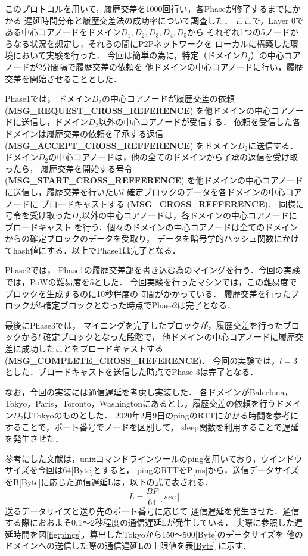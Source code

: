 \documentclass[a4paper,12pt]{jsarticle}
\begin{document}
このプロトコルを用いて，履歴交差を1000回行い，各Phaseが修了するまでにかかる
遅延時間分布と履歴交差法の成功率について調査した．
ここで，Layer 0である中心コアノードをドメイン$D_1, D_2, D_3, D_4, D_5$から
それぞれ1つの5ノードからなる状況を想定し，それらの間にP2Pネットワークを
ローカルに構築した環境において実験を行った．
今回は簡単の為に，特定（ドメイン$D_2$）の中心コアノードが2分間隔で履歴交差の依頼を
他ドメインの中心コアノードに行い，履歴交差を開始させることとした．

Phase1では，
ドメイン$D_2$の中心コアノードが履歴交差の依頼 (\textbf{MSG\_REQUEST\_CROSS\_REFERENCE})
を他ドメインの中心コアノードに送信し，ドメイン$D_2$以外の中心コアノードが受信する．
依頼を受信した各ドメインは履歴交差の依頼を了承する返信 (\textbf{MSG\_ACCEPT\_CROSS\_REFFERENCE})
をドメイン$D_2$に送信する．
ドメイン$D_2$の中心コアノードは，他の全てのドメインから了承の返信を受け取ったら，
履歴交差を開始する号令 (\textbf{MSG\_START\_CROSS\_REFFERENCE}) を他ドメインの中心コアノード
に送信し，履歴交差を行いたい$l$-確定ブロックのデータを各ドメインの中心コアノードに
ブロードキャストする (\textbf{MSG\_CROSS\_REFFERENCE})．
同様に号令を受け取った$D_2$以外の中心コアノードは，各ドメインの中心コアノードにブロードキャスト
を行う．個々のドメインの中心コアノードは全てのドメインからの確定ブロックのデータを受取り，
データを暗号学的ハッシュ関数にかけてhash値にする．以上でPhase1は完了となる．

Phase2では，
Phase1の履歴交差部を書き込む為のマイングを行う．今回の実験では，PoWの難易度を5とした．
今回実験を行ったマシンでは，この難易度でブロックを生成するのに10秒程度の時間がかかっている．
履歴交差を行ったブロックが$l$-確定ブロックとなった時点でPhase2は完了となる．

最後にPhase3では，
マイニングを完了したブロックが，履歴交差を行ったブロックから$l$-確定ブロックとなった段階で，
他ドメインの中心コアノードに履歴交差に成功したことをブロードキャストする
 (\textbf{MSG\_COMPLETE\_CROSS\_REFERENCE})．
今回の実験では，$l=3$とした．ブロードキャストを送信した時点でPhase 3は完了となる．

なお，今回の実装には通信遅延を考慮し実装した．
各ドメインがBalcelona，Tokyo，Paris，Toronto，Washingtonにあるとし，履歴交差の依頼を行うドメイン$D_2$はTokyoのものとした．
2020年2月9日のpingのRTTにかかる時間\cite{pings}を参考にすることで，ポート番号でノードを区別して，
sleep関数を利用することで遅延を発生させた．

参考にした文献\cite{pings}は，unixコマンドラインツールのpingを用いており，ウインドウサイズを今回は$64$[Byte]とすると，
pingのRTTをP[ms]から，送信データサイズをB[Byte]に応じた通信遅延Lは，以下の式で表される．
\begin{equation}
  \label{byt}
    L = \frac{BP}{64} [sec]
\end{equation}
送るデータサイズと送り先のポート番号に応じて
通信遅延を発生させた．通信する際におおよそ0.1〜2秒程度の通信遅延Lが発生している．
実際に参照した遅延時間を図\ref{fig:pings}，算出したTokyoから150〜500[Byte]のデータサイズを
他のドメインへの送信した際の通信遅延Lの上限値を表\ref{Byte} に示す．
\end{document}
